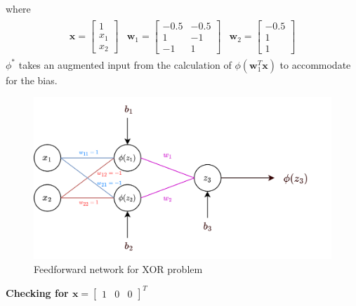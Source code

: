 where
\begin{align}
  \begin{matrix}
  \textbf{x} = \begin{bmatrix}
    1 \\
    x_1 \\
    x_2
  \end{bmatrix} & \textbf{w}_1 = \begin{bmatrix}
    -0.5 & -0.5 \\
    1 & -1  \\
    -1 & 1 
  \end{bmatrix} & \textbf{w}_2 = \begin{bmatrix}
    -0.5 \\
    1 \\
    1
  \end{bmatrix} 
  \end{matrix}
\end{align}
$\phi^{*}$ takes an augmented input from the calculation of $\phi(\textbf{w}_1^T \textbf{x})$ to accommodate for the bias.
\begin{figure}[H]
  \centering
  \includegraphics[scale=1.25]{CHAPTER_2/c2_fig_XOR_final_draw.png}
  \caption{Feedforward network for XOR problem}
  \label{fig: ffn_XOR_final}
\end{figure}
\noindent \textbf{Checking for $\textbf{x} = \begin{bmatrix} 1 & 0 & 0 \end{bmatrix}^T$}
